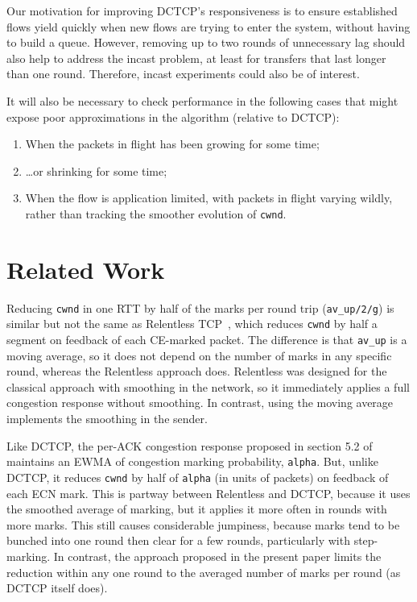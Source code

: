 Our motivation for improving DCTCP's responsiveness is to ensure established
flows yield quickly when new flows are trying to enter the system, without
having to build a queue. However, removing up to two rounds of unnecessary lag
should also help to address the incast problem, at least for transfers that last
longer than one round. Therefore, incast experiments could also be of interest.

It will also be necessary to check performance in the following cases that might
expose poor approximations in the algorithm (relative to DCTCP):
\begin{enumerate}
	\item When the packets in flight has been growing for some time;
	\item \ldots{}or shrinking for some time;
	\item When the flow is application limited, with packets in flight varying
	wildly, rather than tracking the smoother evolution of \texttt{cwnd}.
\end{enumerate}


\section{Related Work}\label{prresp_related}
\balance
Reducing \texttt{cwnd} in one RTT by half of the marks per round trip
(\texttt{av\_up/2/g}) is similar but not the same as Relentless
TCP~\cite{Mathis09:Relentless}, which reduces \texttt{cwnd} by half a segment on
feedback of each CE-marked packet. The difference is that \texttt{av\_up} is a
moving average, so it does not depend on the number of marks in any specific
round, whereas the Relentless approach does. Relentless was designed for the
classical approach with smoothing in the network, so it immediately applies a
full congestion response without smoothing. In contrast, using the moving
average implements the smoothing in the sender.

Like DCTCP, the per-ACK congestion response proposed in section 5.2 of
\cite{Alizadeh11:DCTCP_Analysis} maintains an EWMA of congestion marking
probability, \texttt{alpha}. But, unlike DCTCP, it reduces \texttt{cwnd} by half
of \texttt{alpha} (in units of packets) on feedback of each ECN mark. This is
partway between Relentless and DCTCP, because it uses the smoothed average of
marking, but it applies it more often in rounds with more marks. This still
causes considerable jumpiness, because marks tend to be bunched into one round
then clear for a few rounds, particularly with step-marking. In contrast, the
approach proposed in the present paper limits the reduction within any one round
to the averaged number of marks per round (as DCTCP itself does). %

